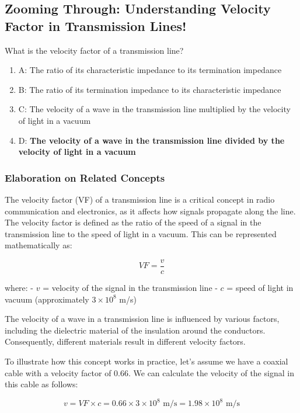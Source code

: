 \subsection{Zooming Through: Understanding Velocity Factor in Transmission Lines!}

\begin{tcolorbox}[colback=gray!10, colframe=black, title=E9F01]
What is the velocity factor of a transmission line?
\begin{enumerate}[label=\Alph*)]
    \item A: The ratio of its characteristic impedance to its termination impedance
    \item B: The ratio of its termination impedance to its characteristic impedance
    \item C: The velocity of a wave in the transmission line multiplied by the velocity of light in a vacuum
    \item D: \textbf{The velocity of a wave in the transmission line divided by the velocity of light in a vacuum}
\end{enumerate} \end{tcolorbox}

\subsubsection*{Elaboration on Related Concepts}

The velocity factor (VF) of a transmission line is a critical concept in radio communication and electronics, as it affects how signals propagate along the line. The velocity factor is defined as the ratio of the speed of a signal in the transmission line to the speed of light in a vacuum. This can be represented mathematically as:

\[
VF = \frac{v}{c}
\]

where:
- \( v \) = velocity of the signal in the transmission line
- \( c \) = speed of light in vacuum (approximately \( 3 \times 10^8 \) m/s)

The velocity of a wave in a transmission line is influenced by various factors, including the dielectric material of the insulation around the conductors. Consequently, different materials result in different velocity factors.

To illustrate how this concept works in practice, let’s assume we have a coaxial cable with a velocity factor of 0.66. We can calculate the velocity of the signal in this cable as follows:

\[
v = VF \times c = 0.66 \times 3 \times 10^8 \text{ m/s} = 1.98 \times 10^8 \text{ m/s}
\]

